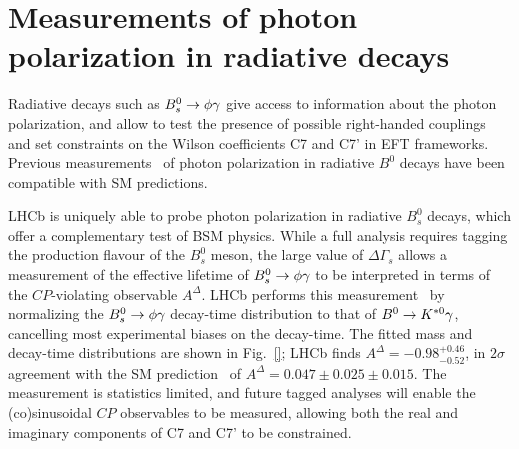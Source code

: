 \section{Measurements of photon polarization in radiative decays}
\label{sec:photpol}
Radiative decays such as ${B}^0_s \rightarrow \phi \gamma$ give access to information
about the photon polarization, and allow to test the presence of possible right-handed
couplings and set constraints on the Wilson coefficients C7 and C7' in EFT frameworks.
Previous measurements~\cite{} of photon polarization in radiative $B^0$ decays
have been compatible with SM predictions. 

LHCb is uniquely able to probe photon polarization in radiative $B^0_s$ decays,
which offer a complementary test of BSM physics. While a full analysis requires
tagging the production flavour of the $B^0_s$ meson, the large value of $\Delta\Gamma_s$
allows a measurement of the effective lifetime of ${B}^0_s \rightarrow \phi \gamma$ to be
interpreted in terms of the $CP$-violating observable $A^\Delta$. LHCb
performs this measurement~\cite{} by normalizing the ${B}^0_s \rightarrow \phi \gamma$ decay-time distribution
to that of ${B}^0 \rightarrow K^{*0} \gamma$, cancelling most experimental biases on the decay-time.
The fitted mass and decay-time distributions are shown in Fig.~\ref{}; LHCb finds
$A^\Delta = -0.98^{+0.46}_{-0.52}$, in $2\sigma$ agreement with the SM
prediction~\cite{} of $A^\Delta = 0.047 \pm 0.025 \pm 0.015$. The measurement is statistics
limited, and future tagged analyses will enable the (co)sinusoidal $CP$ observables to
be measured, allowing both the real and imaginary components of C7 and C7' to be constrained.
